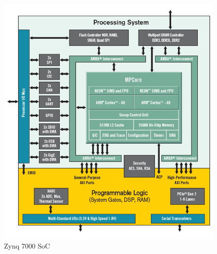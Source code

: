 \begin{figure}[!htbp]
\centering
\captionsetup{justification=centering}
\includegraphics[scale=0.35]{./figure/zynq.PNG}
\caption{Zynq 7000 SoC\cite{paper:42}}
\label{fig:zynq}
\end{figure}


